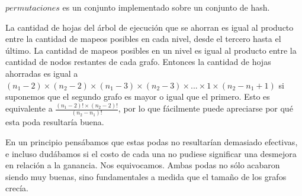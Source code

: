 $permutaciones$ es un conjunto implementado sobre un conjunto de hash.

La cantidad de hojas del árbol de ejecución que se ahorran es igual al
producto entre la cantidad de mapeos posibles en cada nivel, desde el tercero
hasta el último. La cantidad de mapeos posibles en un nivel es igual al
producto entre la cantidad de nodos restantes de cada grafo. Entonces la
cantidad de hojas ahorradas es igual a $(n_1 - 2) \times (n_2 - 2) \times
(n_1 - 3) \times (n_2 - 3) \times ... \times 1 \times (n_2 - n_1 + 1)$ si
suponemos que el segundo grafo es mayor o igual que el primero. Esto es
equivalente a $\frac{(n_1 - 2)! \times (n_2 - 2)!}{(n_2 - n_1)!}$, por lo que fácilmente puede
apreciarse por qué esta poda resultaría buena.

En un principio pensábamos que estas podas no resultarían demasiado efectivas,
e incluso dudábamos si el costo de cada una no pudiese significar una
desmejora en relación a la ganancia. Nos equivocamos. Ambas podas no sólo
acabaron siendo muy buenas, sino fundamentales a medida que el tamaño de los
grafos crecía.